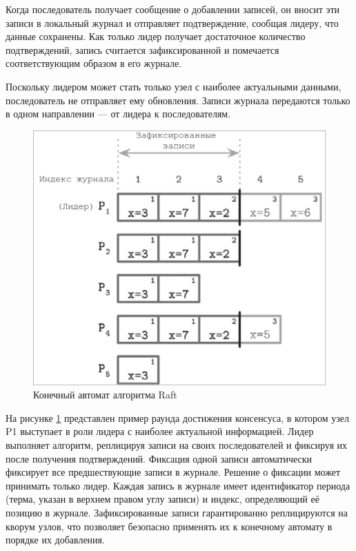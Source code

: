 Когда последователь получает сообщение о добавлении записей, он вносит эти
записи в локальный журнал и отправляет подтверждение, сообщая лидеру, что данные
сохранены. Как только лидер получает достаточное количество подтверждений, запись
считается зафиксированной и помечается соответствующим образом в его журнале.

Поскольку лидером может стать только узел с наиболее актуальными данными,
последователь не отправляет ему обновления. Записи журнала передаются
только в одном направлении — от лидера к последователям.

\begin{figure}
  \centering
  \includegraphics[scale=0.4]{inc/raft-consensus.png}
  \caption{Конечный автомат алгоритма Raft}
  \label{fig:raft-consensus}
\end{figure}

На рисунке \ref{fig:raft-consensus} представлен пример раунда достижения
консенсуса, в котором узел P1 выступает в роли лидера с наиболее актуальной
информацией. Лидер выполняет алгоритм, реплицируя записи на своих последователей
и фиксируя их после получения подтверждений. Фиксация одной записи автоматически
фиксирует все предшествующие записи в журнале. Решение о фиксации может принимать
только лидер. Каждая запись в журнале имеет идентификатор периода (терма, указан в
верхнем правом углу записи) и индекс, определяющий её позицию в журнале.
Зафиксированные записи гарантированно реплицируются на кворум узлов, что
позволяет безопасно применять их к конечному автомату в порядке их добавления.

